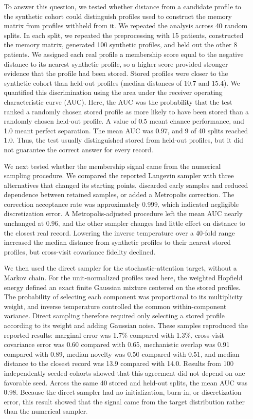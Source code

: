 \documentclass[
  11pt,
  letterpaper,
]{article}
\begin{document}
To answer this question, we tested whether distance from a candidate profile to the synthetic cohort could distinguish profiles used to construct the memory matrix from profiles withheld from it. We repeated the analysis across 40 random splits. In each split, we repeated the preprocessing with 15 patients, constructed the memory matrix, generated 100 synthetic profiles, and held out the other 8 patients. We assigned each real profile a membership score equal to the negative distance to its nearest synthetic profile, so a higher score provided stronger evidence that the profile had been stored. Stored profiles were closer to the synthetic cohort than held-out profiles (median distances of 10.7 and 15.4). We quantified this discrimination using the area under the receiver operating characteristic curve (AUC). Here, the AUC was the probability that the test ranked a randomly chosen stored profile as more likely to have been stored than a randomly chosen held-out profile. A value of 0.5 meant chance performance, and 1.0 meant perfect separation. The mean AUC was 0.97, and 9 of 40 splits reached 1.0. Thus, the test usually distinguished stored from held-out profiles, but it did not guarantee the correct answer for every record.

We next tested whether the membership signal came from the numerical sampling procedure. We compared the reported Langevin sampler with three alternatives that changed its starting points, discarded early samples and reduced dependence between retained samples, or added a Metropolis correction. The correction acceptance rate was approximately 0.999, which indicated negligible discretization error. A Metropolis-adjusted procedure left the mean AUC nearly unchanged at 0.96, and the other sampler changes had little effect on distance to the closest real record. Lowering the inverse temperature over a 40-fold range increased the median distance from synthetic profiles to their nearest stored profiles, but cross-visit covariance fidelity declined.

We then used the direct sampler for the stochastic-attention target, without a Markov chain. For the unit-normalized profiles used here, the weighted Hopfield energy defined an exact finite Gaussian mixture centered on the stored profiles. The probability of selecting each component was proportional to its multiplicity weight, and inverse temperature controlled the common within-component variance. Direct sampling therefore required only selecting a stored profile according to its weight and adding Gaussian noise. These samples reproduced the reported results: marginal error was 1.7\% compared with 1.3\%, cross-visit covariance error was 0.60 compared with 0.65, mechanistic overlap was 0.91 compared with 0.89, median novelty was 0.50 compared with 0.51, and median distance to the closest record was 13.9 compared with 14.0. Results from 100 independently seeded cohorts showed that this agreement did not depend on one favorable seed. Across the same 40 stored and held-out splits, the mean AUC was 0.98. Because the direct sampler had no initialization, burn-in, or discretization error, this result showed that the signal came from the target distribution rather than the numerical sampler.
\end{document}
